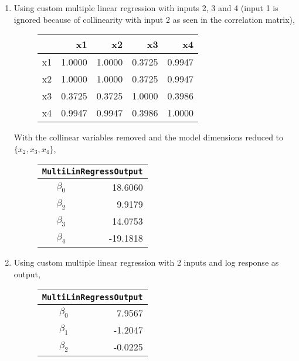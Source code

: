 \begin{enumerate}
\begin{figure}[H]
\end{figure}

\item Using custom multiple linear regression with inputs 2, 3 and 4 (input 1 is ignored because of collinearity with input 2 as seen in the correlation matrix), \\

\begin{figure}[H]
	\centering
	  \renewcommand{\arraystretch}{2}
	\begin{tabular}{lrrrr}
		\toprule
		 &      x1 &      x2 &      x3 &      x4 \\
		\midrule
		x1 &  1.0000 &  1.0000 &  0.3725 &  0.9947 \\
		x2 &  1.0000 &  1.0000 &  0.3725 &  0.9947 \\
		x3 &  0.3725 &  0.3725 &  1.0000 &  0.3986 \\
		x4 &  0.9947 &  0.9947 &  0.3986 &  1.0000 \\
		\bottomrule
	\end{tabular}
\end{figure}

With the collinear variables removed and the model dimensions reduced to $ \{x_2, x_3, x_4\} $, \\

\begin{figure}[H]
	\centering
	\begin{tabular}{@{}rr@{}}
		\toprule
		\multicolumn{2}{c}{\texttt{MultiLinRegressOutput}} \\
		\midrule
		$\beta_0$ &          18.6060 \\
		$\beta_2$ &           9.9179 \\
		$\beta_3$ &          14.0753 \\
		$\beta_4$ &         -19.1818 \\
		\bottomrule
	\end{tabular}
\end{figure}


\item Using custom multiple linear regression with 2 inputs and log response as output, \\

\begin{figure}[H]
	\centering
	\begin{tabular}{@{}rr@{}}
		\toprule
		\multicolumn{2}{c}{\texttt{MultiLinRegressOutput}} \\
		\midrule
		$\beta_0$ &           7.9567 \\
		$\beta_1$ &          -1.2047 \\
		$\beta_2$ &          -0.0225 \\
		\bottomrule
	\end{tabular}
\end{figure}


\end{enumerate}
